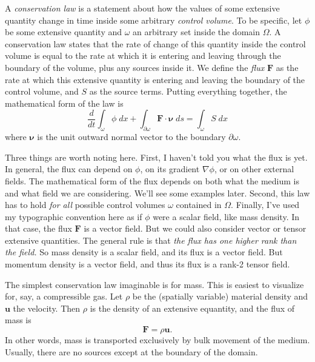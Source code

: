 \documentclass{article}
\theoremstyle{definition}
\theoremstyle{plain}
\newcommand{\bs}{\boldsymbol}
\begin{document}
A \emph{conservation law} is a statement about how the values of some extensive quantity change in time inside some arbitrary \emph{control volume}.
To be specific, let $\phi$ be some extensive quantity and $\omega$ an arbitrary set inside the domain $\Omega$.
A conservation law states that the rate of change of this quantity inside the control volume is equal to the rate at which it is entering and leaving through the boundary of the volume, plus any sources inside it.
We define the \emph{flux} $\bs F$ as the rate at which this extensive quantity is entering and leaving the boundary of the control volume, and $S$ as the source terms.
Putting everything together, the mathematical form of the law is
\begin{equation}
    \frac{d}{dt}\int_\omega\phi\;dx + \int_{\partial\omega}\bs F\cdot\bs \nu\;ds = \int_\omega S\;dx
\end{equation}
where $\bs \nu$ is the unit outward normal vector to the boundary $\partial\omega$.

Three things are worth noting here.
First, I haven't told you what the flux is yet.
In general, the flux can depend on $\phi$, on its gradient $\nabla\phi$, or on other external fields.
The mathematical form of the flux depends on both what the medium is and what field we are considering.
We'll see some examples later.
Second, this law has to hold \emph{for all} possible control volumes $\omega$ contained in $\Omega$.
Finally, I've used my typographic convention here as if $\phi$ were a scalar field, like mass density.
In that case, the flux $\bs F$ is a vector field.
But we could also consider vector or tensor extensive quantities.
The general rule is that \emph{the flux has one higher rank than the field.}
So mass density is a scalar field, and its flux is a vector field.
But momentum density is a vector field, and thus its flux is a rank-2 tensor field.

The simplest conservation law imaginable is for mass.
This is easiest to visualize for, say, a compressible gas.
Let $\rho$ be the (spatially variable) material density and $\bs u$ the velocity.
Then $\rho$ is the density of an extensive equantity, and the flux of mass is
\begin{equation}
    \bs F = \rho\bs u.
\end{equation}
In other words, mass is transported exclusively by bulk movement of the medium.
Usually, there are no sources except at the boundary of the domain.
\end{document}
